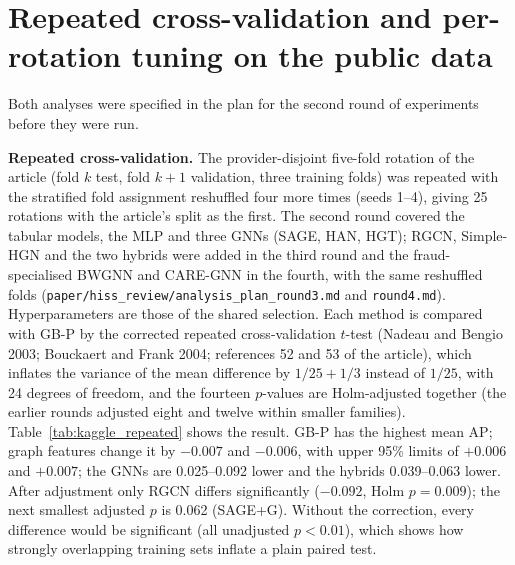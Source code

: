 \documentclass[pdflatex,sn-vancouver-num]{sn-jnl}
\newcommand{\MainRefNadeau}{52}
\newcommand{\MainRefBouckaert}{53}
\begin{document}
\section{Repeated cross-validation and per-rotation tuning on the public data}\label{sec:s_kaggle}
Both analyses were specified in the plan for the second round of experiments before they were run.

\textbf{Repeated cross-validation.} The provider-disjoint five-fold rotation of the article (fold $k$ test,
fold $k+1$ validation, three training folds) was repeated with the stratified fold assignment reshuffled four more
times (seeds 1--4), giving 25 rotations with the article's split as the first. The second round covered the
tabular models, the MLP and three GNNs (SAGE, HAN, HGT); RGCN, Simple-HGN and the two hybrids were added in the
third round and the fraud-specialised BWGNN and CARE-GNN in the fourth, with the same reshuffled folds
(\texttt{paper/\allowbreak hiss\_review/\allowbreak analysis\_plan\_round3.md} and \texttt{round4.md}). Hyperparameters are those of the shared selection. Each method is compared with GB-P by
the corrected repeated cross-validation $t$-test (Nadeau and Bengio 2003; Bouckaert and Frank 2004; references
\MainRefNadeau{} and \MainRefBouckaert{} of the article), which inflates the variance
of the mean difference by $1/25 + 1/3$ instead of $1/25$, with 24 degrees of freedom, and the fourteen $p$-values
are Holm-adjusted together (the earlier rounds adjusted eight and twelve within smaller families).
Table~\ref{tab:kaggle_repeated} shows the result. GB-P has the highest mean AP; graph features change it by $-0.007$
and $-0.006$, with upper 95\% limits of $+0.006$ and $+0.007$; the GNNs are 0.025--0.092 lower and the hybrids
0.039--0.063 lower. After adjustment only RGCN differs significantly ($-0.092$, Holm $p=0.009$); the next smallest
adjusted $p$ is 0.062 (SAGE+G). Without the correction, every difference would be significant (all unadjusted
$p<0.01$), which shows how strongly overlapping training sets inflate a plain paired test.
\end{document}
